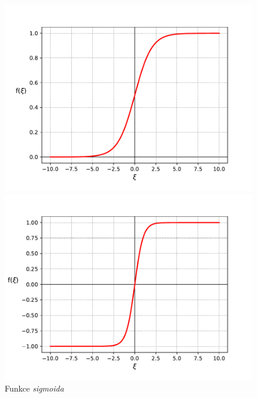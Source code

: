 \begin{figure}[!htb]
    \centering
    \begin{minipage}{0.5\textwidth}
        \centering
        \includegraphics[width=1\textwidth]{../img/graph_sigmoid.pdf}
        \caption{Funkce \emph{sigmoida}}
        \label{fig:graph_sigmoid}
    \end{minipage}%
    \begin{minipage}{0.5\textwidth}
        \centering
        \includegraphics[width=1\textwidth]{../img/graph_tanh.pdf}

\end{minipage}
\end{figure}
